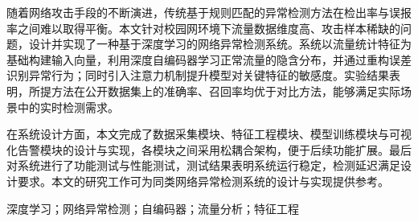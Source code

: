 
随着网络攻击手段的不断演进，传统基于规则匹配的异常检测方法在检出率与误报率之间难以取得平衡。本文针对校园网环境下流量数据维度高、攻击样本稀缺的问题，设计并实现了一种基于深度学习的网络异常检测系统。系统以流量统计特征为基础构建输入向量，利用深度自编码器学习正常流量的隐含分布，并通过重构误差识别异常行为；同时引入注意力机制提升模型对关键特征的敏感度。实验结果表明，所提方法在公开数据集上的准确率、召回率均优于对比方法，能够满足实际场景中的实时检测需求。

在系统设计方面，本文完成了数据采集模块、特征工程模块、模型训练模块与可视化告警模块的设计与实现，各模块之间采用松耦合架构，便于后续功能扩展。最后对系统进行了功能测试与性能测试，测试结果表明系统运行稳定，检测延迟满足设计要求。本文的研究工作可为同类网络异常检测系统的设计与实现提供参考。

\vspace{0.5em}
深度学习；网络异常检测；自编码器；流量分析；特征工程
